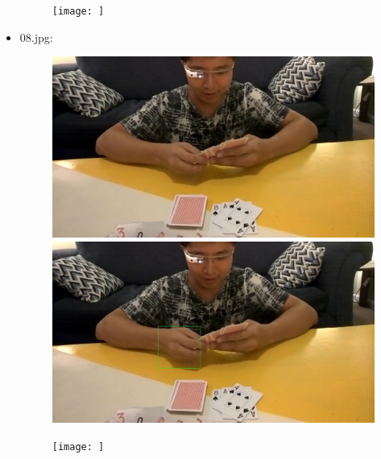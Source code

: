 \begin{itemize}
\begin{figure}[!htb]
\begin{minipage}{0.33\textwidth}
            \end{minipage}\hfill
            \begin{minipage}{0.33\textwidth}
                \centering
                \texttt{[image: ]}
            \end{minipage}
        \end{figure}
    \item 08.jpg:
        \begin{figure}[!htb]
            \begin{minipage}{0.33\textwidth}
            \centering
            \includegraphics[scale = 0.135]{images/results/original/08.jpg}
            \end{minipage}\hfill
            \begin{minipage}{0.33\textwidth}
                \centering
                \includegraphics[scale = 0.135]{images/results/detection/08_detections.jpg}
            \end{minipage}\hfill
            \begin{minipage}{0.33\textwidth}
                \centering
                \texttt{[image: ]}
            \end{minipage}

\end{figure}
\end{itemize}
